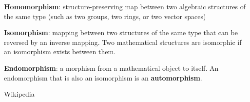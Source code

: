 \documentclass[oneside,10pt]{scrartcl}
\begin{document}
\begin{multicols*}{2}
\begin{tcolorbox}
\textbf{Homomorphism}: structure-preserving map between two algebraic structures of the same type (such as two groups, two rings, or two vector spaces)

\textbf{Isomorphism}: mapping between two structures of the same type that can be reversed by an inverse mapping. Two mathematical structures are isomorphic if an isomorphism exists between them.

\textbf{Endomorphism}: a morphism from a mathematical object to itself. An endomorphism that is also an isomorphism is an \textbf{automorphism}.

{\tiny Wikipedia}
\end{tcolorbox}

\end{multicols*}
\end{document}
